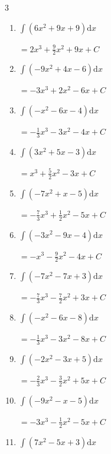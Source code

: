 \begin{multicols}{3}
\begin{enumerate}
  \item $\displaystyle \int \left( 6x^{2}+9x+9 \right) \mathrm{d}x$

        $\displaystyle =2x^{3}+\frac{9}{2}x^{2}+9x+ C$

\columnbreak %

  \item $\displaystyle \int \left( -9x^{2}+4x-6 \right) \mathrm{d}x$

        $\displaystyle =-3x^{3}+2x^{2}-6x+ C$

  \item $\displaystyle \int \left( -x^{2}-6x-4 \right) \mathrm{d}x$

        $\displaystyle =-\frac{1}{3}x^{3}-3x^{2}-4x+ C$

  \item $\displaystyle \int \left( 3x^{2}+5x-3 \right) \mathrm{d}x$

        $\displaystyle =x^{3}+\frac{5}{2}x^{2}-3x+ C$

  \item $\displaystyle \int \left( -7x^{2}+x-5 \right) \mathrm{d}x$

        $\displaystyle =-\frac{7}{3}x^{3}+\frac{1}{2}x^{2}-5x+ C$

  \item $\displaystyle \int \left( -3x^{2}-9x-4 \right) \mathrm{d}x$

        $\displaystyle =-x^{3}-\frac{9}{2}x^{2}-4x+ C$

  \item $\displaystyle \int \left( -7x^{2}-7x+3 \right) \mathrm{d}x$

        $\displaystyle =-\frac{7}{3}x^{3}-\frac{7}{2}x^{2}+3x+ C$

  \item $\displaystyle \int \left( -x^{2}-6x-8 \right) \mathrm{d}x$

        $\displaystyle =-\frac{1}{3}x^{3}-3x^{2}-8x+ C$

  \item $\displaystyle \int \left( -2x^{2}-3x+5 \right) \mathrm{d}x$

        $\displaystyle =-\frac{2}{3}x^{3}-\frac{3}{2}x^{2}+5x+ C$

  \item $\displaystyle \int \left( -9x^{2}-x-5 \right) \mathrm{d}x$

        $\displaystyle =-3x^{3}-\frac{1}{2}x^{2}-5x+ C$

  \item $\displaystyle \int \left( 7x^{2}-5x+3 \right) \mathrm{d}x$


\end{enumerate}
\end{multicols}
